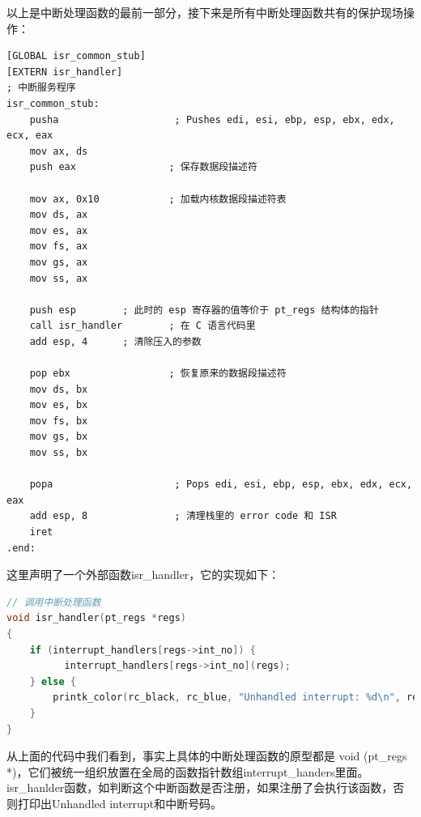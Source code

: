 \par 以上是中断处理函数的最前一部分，接下来是所有中断处理函数共有的保护现场操作：
\begin{lstlisting}[language = {[x86masm]Assembler}, caption = idt/idt\_s.s]
[GLOBAL isr_common_stub]
[EXTERN isr_handler]
; 中断服务程序
isr_common_stub:
	pusha                    ; Pushes edi, esi, ebp, esp, ebx, edx, ecx, eax
	mov ax, ds
	push eax                ; 保存数据段描述符
	
	mov ax, 0x10            ; 加载内核数据段描述符表
	mov ds, ax
	mov es, ax
	mov fs, ax
	mov gs, ax
	mov ss, ax
	
	push esp		; 此时的 esp 寄存器的值等价于 pt_regs 结构体的指针
	call isr_handler        ; 在 C 语言代码里
	add esp, 4 		; 清除压入的参数
	
	pop ebx                 ; 恢复原来的数据段描述符
	mov ds, bx
	mov es, bx
	mov fs, bx
	mov gs, bx
	mov ss, bx
	
	popa                     ; Pops edi, esi, ebp, esp, ebx, edx, ecx, eax
	add esp, 8               ; 清理栈里的 error code 和 ISR
	iret
.end:
\end{lstlisting}

\par 这里声明了一个外部函数isr\_handler，它的实现如下：
\begin{lstlisting}[language = C, caption = idt/idt.c]
// 调用中断处理函数
void isr_handler(pt_regs *regs)
{
	if (interrupt_handlers[regs->int_no]) {
	      interrupt_handlers[regs->int_no](regs);
	} else {
		printk_color(rc_black, rc_blue, "Unhandled interrupt: %d\n", regs->int_no);
	}
}
\end{lstlisting}

\par 从上面的代码中我们看到，事实上具体的中断处理函数的原型都是 void (pt\_regs *)，它们被统一组织放置在全局的函数指针数组interrupt\_handers里面。isr\_hanlder函数，如判断这个中断函数是否注册，如果注册了会执行该函数，否则打印出Unhandled interrupt和中断号码。

